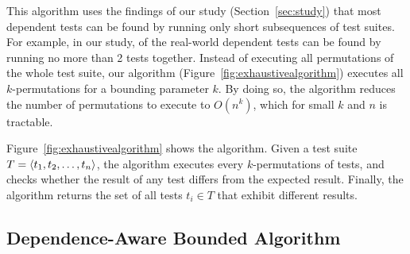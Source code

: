 
This algorithm uses the findings of our study
(Section~\ref{sec:study})
that most dependent tests can be found by running only short
subsequences of test suites. For example,
in our study, \pertange of the real-world dependent tests
can be found by running no more than 2 tests together.
Instead of executing all permutations of the
whole test suite, our algorithm (Figure~\ref{fig:exhaustivealgorithm})
executes all $k$-permutations for a bounding
parameter $k$.
By doing so, the algorithm reduces
the number of permutations to execute
to $O(n^k)$, which for small $k$ and $n$ is tractable. 


Figure~\ref{fig:exhaustivealgorithm} shows the algorithm.
Given a test suite $T =  \langle t_1, t_2, \ldots, t_n \rangle $, the
algorithm executes every $k$-permutations of tests,
and checks whether the result of any test differs
from the expected result. Finally, the algorithm returns the set
of all tests $t_i \in T$
that exhibit different results.





\subsection{Dependence-Aware Bounded Algorithm}
\label{sec:advalgorithm}

